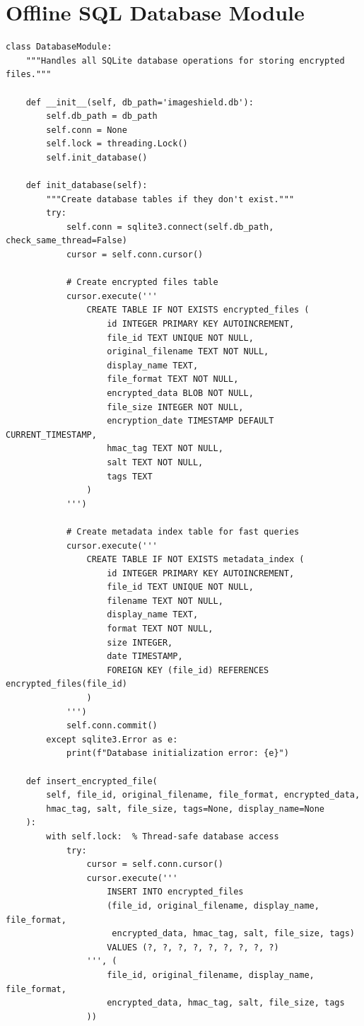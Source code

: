 \documentclass[12pt,a4paper]{report}
\begin{document}
\section{Offline SQL Database Module}
\begin{lstlisting}
class DatabaseModule:
    """Handles all SQLite database operations for storing encrypted files."""
    
    def __init__(self, db_path='imageshield.db'):
        self.db_path = db_path
        self.conn = None
        self.lock = threading.Lock()
        self.init_database()
    
    def init_database(self):
        """Create database tables if they don't exist."""
        try:
            self.conn = sqlite3.connect(self.db_path, check_same_thread=False)
            cursor = self.conn.cursor()
            
            # Create encrypted files table
            cursor.execute('''
                CREATE TABLE IF NOT EXISTS encrypted_files (
                    id INTEGER PRIMARY KEY AUTOINCREMENT,
                    file_id TEXT UNIQUE NOT NULL,
                    original_filename TEXT NOT NULL,
                    display_name TEXT,
                    file_format TEXT NOT NULL,
                    encrypted_data BLOB NOT NULL,
                    file_size INTEGER NOT NULL,
                    encryption_date TIMESTAMP DEFAULT CURRENT_TIMESTAMP,
                    hmac_tag TEXT NOT NULL,
                    salt TEXT NOT NULL,
                    tags TEXT
                )
            ''')
            
            # Create metadata index table for fast queries
            cursor.execute('''
                CREATE TABLE IF NOT EXISTS metadata_index (
                    id INTEGER PRIMARY KEY AUTOINCREMENT,
                    file_id TEXT UNIQUE NOT NULL,
                    filename TEXT NOT NULL,
                    display_name TEXT,
                    format TEXT NOT NULL,
                    size INTEGER,
                    date TIMESTAMP,
                    FOREIGN KEY (file_id) REFERENCES encrypted_files(file_id)
                )
            ''')
            self.conn.commit()
        except sqlite3.Error as e:
            print(f"Database initialization error: {e}")
    
    def insert_encrypted_file(
        self, file_id, original_filename, file_format, encrypted_data,
        hmac_tag, salt, file_size, tags=None, display_name=None
    ):
        with self.lock:  % Thread-safe database access
            try:
                cursor = self.conn.cursor()
                cursor.execute('''
                    INSERT INTO encrypted_files 
                    (file_id, original_filename, display_name, file_format, 
                     encrypted_data, hmac_tag, salt, file_size, tags)
                    VALUES (?, ?, ?, ?, ?, ?, ?, ?, ?)
                ''', (
                    file_id, original_filename, display_name, file_format,
                    encrypted_data, hmac_tag, salt, file_size, tags
                ))
                

\end{lstlisting}
\end{document}
